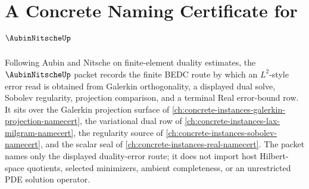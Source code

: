 \chapter{A Concrete Naming Certificate for $\AubinNitscheUp$}
\label{ch:concrete-instances-aubin-nitsche-namecert}

Following Aubin and Nitsche on finite-element duality estimates, the $\AubinNitscheUp$ packet records the finite BEDC route by which an $L^2$-style error read is obtained from Galerkin orthogonality, a displayed dual solve, Sobolev regularity, projection comparison, and a terminal Real error-bound row. It sits over the Galerkin projection surface of \autoref{ch:concrete-instances-galerkin-projection-namecert}, the variational dual row of \autoref{ch:concrete-instances-lax-milgram-namecert}, the regularity source of \autoref{ch:concrete-instances-sobolev-namecert}, and the scalar seal of \autoref{ch:concrete-instances-real-namecert}. The packet names only the displayed duality-error route; it does not import host Hilbert-space quotients, selected minimizers, ambient completeness, or an unrestricted PDE solution operator.

